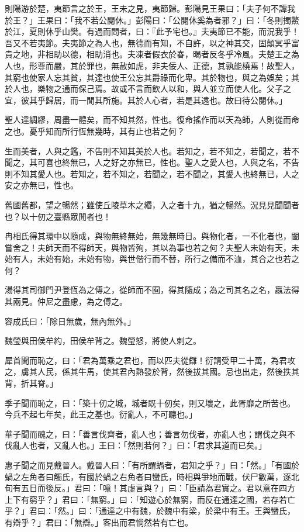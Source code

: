 
\begin{pinyinscope}
則陽游於楚，夷節言之於王，王未之見，夷節歸。彭陽見王果曰：「夫子何不譚我於王？」王果曰：「我不若公閱休。」彭陽曰：「公閱休奚為者邪？」曰：「冬則擉鱉於江，夏則休乎山樊。有過而問者，曰：『此予宅也。』夫夷節已不能，而況我乎！吾又不若夷節。夫夷節之為人也，無德而有知，不自許，以之神其交，固顛冥乎富貴之地，非相助以德，相助消也。夫凍者假衣於春，暍者反冬乎冷風。夫楚王之為人也，形尊而嚴，其於罪也，無赦如虎，非夫佞人、正德，其孰能橈焉！故聖人，其窮也使家人忘其貧，其達也使王公忘其爵祿而化卑。其於物也，與之為娛矣；其於人也，樂物之通而保己焉。故或不言而飲人以和，與人並立而使人化。父子之宜，彼其乎歸居，而一閒其所施。其於人心者，若是其遠也。故曰待公閱休。」

聖人達綢繆，周盡一體矣，而不知其然，性也。復命搖作而以天為師，人則從而命之也。憂乎知而所行恆無幾時，其有止也若之何？

生而美者，人與之鑑，不告則不知其美於人也。若知之，若不知之，若聞之，若不聞之，其可喜也終無已，人之好之亦無已，性也。聖人之愛人也，人與之名，不告則不知其愛人也。若知之，若不知之，若聞之，若不聞之，其愛人也終無已，人之安之亦無已，性也。

舊國舊都，望之暢然；雖使丘陵草木之緡，入之者十九，猶之暢然。況見見聞聞者也？以十仞之臺縣眾閒者也！

冉相氏得其環中以隨成，與物無終無始，無幾無時日。與物化者，一不化者也，闔嘗舍之！夫師天而不得師天，與物皆殉，其以為事也若之何？夫聖人未始有天，未始有人，未始有始，未始有物，與世偕行而不替，所行之備而不洫，其合之也若之何？

湯得其司御門尹登恆為之傅之，從師而不囿，得其隨成；為之司其名之名，嬴法得其兩見。仲尼之盡慮，為之傅之。

容成氏曰：「除日無歲，無內無外。」

魏瑩與田侯牟約，田侯牟背之。魏瑩怒，將使人刺之。

犀首聞而恥之，曰：「君為萬乘之君也，而以匹夫從讎！衍請受甲二十萬，為君攻之，虜其人民，係其牛馬，使其君內熱發於背，然後拔其國。忌也出走，然後抶其背，折其脊。」

季子聞而恥之，曰：「築十仞之城，城者既十仞矣，則又壞之，此胥靡之所苦也。今兵不起七年矣，此王之基也。衍亂人，不可聽也。」

華子聞而醜之，曰：「善言伐齊者，亂人也；善言勿伐者，亦亂人也；謂伐之與不伐亂人也者，又亂人也。」王曰：「然則若何？」曰：「君求其道而已矣。」

惠子聞之而見戴晉人。戴晉人曰：「有所謂蝸者，君知之乎？」曰：「然。」「有國於蝸之左角者曰觸氏，有國於蝸之右角者曰蠻氏，時相與爭地而戰，伏尸數萬，逐北旬有五日而後反。」君曰：「噫！其虛言與？」曰：「臣請為君實之。君以意在四方上下有窮乎？」君曰：「無窮。」曰：「知遊心於無窮，而反在通達之國，若存若亡乎？」君曰：「然。」曰：「通達之中有魏，於魏中有梁，於梁中有王。王與蠻氏，有辯乎？」君曰：「無辯。」客出而君惝然若有亡也。


\end{pinyinscope}
